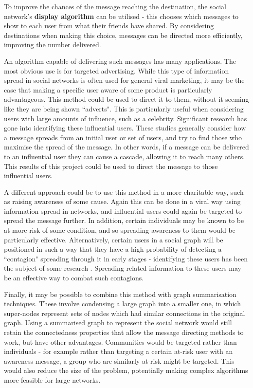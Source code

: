 \documentclass[bsc,frontabs,twoside,singlespacing,parskip,deptreport]{infthesis}     %
\begin{document}
To improve the chances of the message reaching the destination, the social network's \textbf{display algorithm} can be utilised - this chooses which messages to show to each user from what their friends have shared. By considering destinations when making this choice, messages can be directed more efficiently, improving the number delivered.

An algorithm capable of delivering such messages has many applications. The most obvious use is for targeted advertising. While this type of information spread in social networks is often used for general viral marketing, it may be the case that making a specific user aware of some product is particularly advantageous. This method could be used to direct it to them, without it seeming like they are being shown ``adverts". This is particularly useful when considering users with large amounts of influence, such as a celebrity. Significant research has gone into identifying these influential users\cite{InfluenceMaximisation1, InfluenceMaximisation2, LabelledInfluenceMaximisation}. These studies generally consider how a message spreads from an initial user or set of users, and try to find those who maximise the spread of the message. In other words, if a message can be delivered to an influential user they can cause a cascade, allowing it to reach many others. This results of this project could be used to direct the message to those influential users.

A different approach could be to use this method in a more charitable way, such as raising awareness of some cause. Again this can be done in a viral way using information spread in networks, and influential users could again be targeted to spread the message further. In addition, certain individuals may be known to be at more risk of some condition, and so spreading awareness to them would be particularly effective. Alternatively, certain users in a social graph will be positioned in such a way that they have a high probability of detecting a ``contagion" spreading through it in early stages - identifying these users has been the subject of some research \cite{OutbreakDetection}. Spreading related information to these users may be an effective way to combat such contagions.

Finally, it may be possible to combine this method with graph summarisation techniques\cite{GraphSummary}. These involve condensing a large graph into a smaller one, in which super-nodes represent sets of nodes which had similar connections in the original graph. Using a summarised graph to represent the social network would still retain the connectedness properties that allow the message directing methods to work, but have other advantages. Communities would be targeted rather than individuals - for example rather than targeting a certain at-risk user with an awareness message, a group who are similarly at-risk might be targeted. This would also reduce the size of the problem, potentially making complex algorithms more feasible for large networks.
\end{document}
